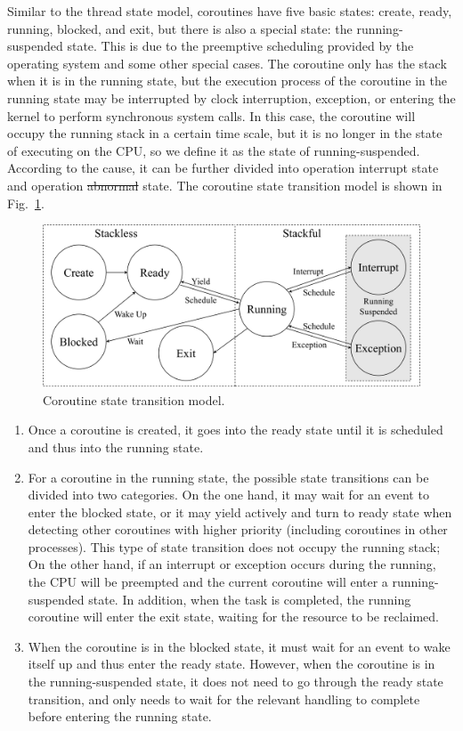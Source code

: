 \documentclass[sigconf,review,anonymous]{acmart}
\providecommand{\DIFadd}[1]{{\protect\color{blue}\uwave{#1}}} %
\providecommand{\DIFdel}[1]{{\protect\color{red}\sout{#1}}}                      %
\providecommand{\DIFaddbegin}{} %
\providecommand{\DIFaddend}{} %
\providecommand{\DIFdelbegin}{} %
\providecommand{\DIFdelend}{} %
\begin{document}
Similar to the thread state model, coroutines have five basic states: create, ready, running, blocked, and exit, but there is also a special state: the running-suspended state. This is due to the preemptive scheduling provided by the operating system and some other special cases. The coroutine only has the stack when it is in the running state, but the execution process of the coroutine in the running state may be interrupted by clock interruption, exception, or entering the kernel to perform synchronous system calls. In this case, the coroutine will occupy the running stack in a certain time scale, but it is no longer in the state of executing on the CPU, so we define it as the state of running-suspended. According to the cause, it can be further divided into operation interrupt state and operation \DIFdelbegin \DIFdel{abnormal }\DIFdelend \DIFaddbegin \DIFadd{exception }\DIFaddend state. The coroutine state transition model is shown in Fig.~\ref{fig:state}.

\begin{figure}[h]
  \centering
  \includegraphics[width=\linewidth]{assets/cstate.pdf}
  \caption{Coroutine state transition model.}
  \label{fig:state}
\end{figure}

\begin{enumerate}[leftmargin=*]
    \item Once a coroutine is created, it goes into the ready state until it is scheduled and thus into the running state.
    \item For a coroutine in the running state, the possible state transitions can be divided into two categories. On the one hand, it may wait for an event to enter the blocked state, or it may yield actively and turn to ready state when detecting other coroutines with higher priority (including coroutines in other processes). This type of state transition does not occupy the running stack; On the other hand, if an interrupt or exception occurs during the running, the CPU will be preempted and the current coroutine will enter a running-suspended state. In addition, when the task is completed, the running coroutine will enter the exit state, waiting for the resource to be reclaimed.
    \item When the coroutine is in the blocked state, it must wait for an event to wake itself up and thus enter the ready state. However, when the coroutine is in the running-suspended state, it does not need to go through the ready state transition, and only needs to wait for the relevant handling to complete before entering the running state.
\end{enumerate}
\end{document}
